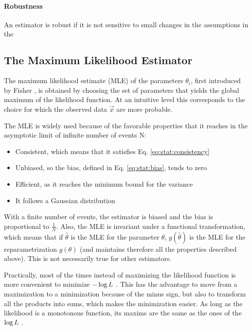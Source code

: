 
\paragraph{Robustness}
An estimator is robust if it is not sensitive to small changes in the assumptions in the \pdf


\subsection{The Maximum Likelihood Estimator}
\label{sec:stat:MLE}

The maximum likelihood estimate (MLE) of the parameters $\theta_i$, first introduced by Fisher \cite{fisher1911absolute}\cite{aldrich1997}, is obtained by choosing the set of parameters that yields the global maximum of the likelihood function. At an intuitive level this corresponds to the choice for which the observed data $\vec{x}$ are more probable. 

The MLE is widely used because of the favorable properties that it reaches in the asymptotic limit of infinite number of events N:
\begin{itemize}
\item Consistent, which means that it satisfies Eq. \ref{eq:stat:consistency}
\item Unbiased, so the bias, defined in Eq. \ref{eq:stat:bias}, tends to zero
\item Efficient, as it reaches the minimum bound for the variance 
\item It follows a Gaussian distribution
\end{itemize}
With a finite number of events, the estimator is biased and the bias is proportional to $\frac{1}{N}$. Also, the MLE is invariant under a functional transformation, which means that if $\hat{\theta}$ is the MLE for the parameter $\theta$, $g(\hat{\theta})$ is the MLE for the reparametrization $g(\theta)$ (and maintains therefore all the properties described above). This is not necessarily true for other estimators.

Practically, most of the times instead of maximizing the likelihood function is more convenient to minimize $-\log{L} \ $. This has the advantage to move from a maximization to a minimization because of the minus sign, but also to transform all the products into sums, which makes the minimization easier. As long as the likelihood is a monotonous function, its maxims are the same as the ones of the $\log{L} \ $.

